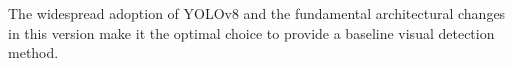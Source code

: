 \documentclass[../main.tex]{subfiles}
\begin{document}
The widespread adoption of YOLOv8 and the fundamental architectural changes in this version make it the optimal choice to provide a baseline visual detection method.













\end{document}
